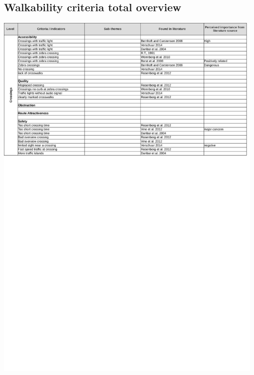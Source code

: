 \begin{appendix}
\section{Walkability criteria total overview}\label{Acriteria}
\includegraphics[width=\textwidth]{img/annex/A1_crossings_criteria.pdf}

\end{appendix}
